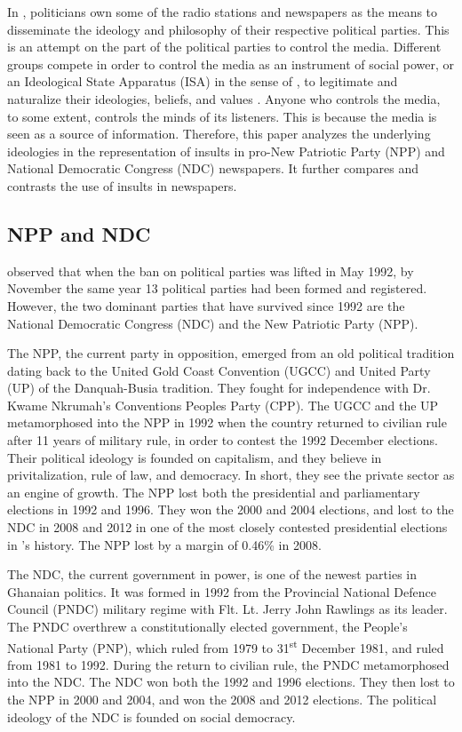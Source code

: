 \documentclass[output=paper,modfonts]{langscibook}
\begin{document}
In , politicians own some of the radio stations and newspapers as the means to disseminate the ideology and philosophy of their respective political parties. This is an attempt on the part of the political parties to control the media. Different groups compete in order to control the media as an instrument of social power, or an Ideological State Apparatus (ISA) in the sense of \citet{Althusser1971}, to legitimate and naturalize their ideologies, beliefs, and values \citep{vanDijk1995}. Anyone who controls the media, to some extent, controls the minds of its listeners. This is because the media is seen as a  source of information. Therefore, this paper analyzes the underlying ideologies in the representation of insults in pro-New Patriotic Party (NPP) and National Democratic Congress (NDC) newspapers. It further compares and contrasts the use of insults in newspapers.

\subsection{NPP and NDC}\label{sec:ofori:1.1}

\citet{Ninsin2006} observed that when the ban on political parties was lifted in May 1992, by November the same year 13 political parties had been formed and registered. However, the two dominant parties that have survived since 1992 are the National Democratic Congress (NDC) and the New Patriotic Party (NPP). 

The NPP, the current party in opposition, emerged from an old political tradition dating back to the United Gold Coast Convention (UGCC) and United Party (UP) of the Danquah-Busia tradition. They fought for independence with Dr. Kwame Nkrumah’s Conventions Peoples Party (CPP). The UGCC and the UP metamorphosed into the NPP in 1992 when the country returned to civilian rule after 11 years of military rule, in order to contest the 1992 December elections. Their political ideology is founded on capitalism, and they believe in privitalization, rule of law, and democracy. In short, they see the private sector as an engine of growth. The NPP lost both the presidential and parliamentary elections in 1992 and 1996. They won the 2000 and 2004 elections, and lost to the NDC in 2008 and 2012 in one of the most closely contested presidential elections in ’s history. The NPP lost by a margin of 0.46\% in 2008.

\newpage 
The NDC, the current government in power, is one of the newest parties in Ghanaian politics. It was formed in 1992 from the Provincial National Defence Council (PNDC) military regime with Flt. Lt. Jerry John Rawlings as its leader. The PNDC overthrew a constitutionally elected government, the People's National Party (PNP), which ruled  from 1979 to 31\textsuperscript{st} December 1981, and ruled  from 1981 to 1992. During the return to civilian rule, the PNDC metamorphosed into the NDC. The NDC won both the 1992 and 1996 elections. They then lost to the NPP in 2000 and 2004, and won the 2008 and 2012 elections. The political ideology of the NDC is founded on social democracy. 
\end{document}
